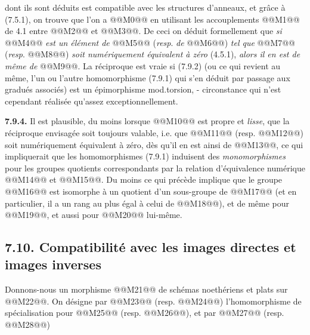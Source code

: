
dont ils sont déduits est compatible avec les structures d'anneaux, et grâce à (7.5.1), on trouve que l'on a
@@M0@@
en utilisant les accouplements @@M1@@ de 4.1 entre @@M2@@ et @@M3@@. De ceci on déduit formellement que \emph{si} @@M4@@ \emph{est un élément de} @@M5@@ (\emph{resp}. \emph{de} @@M6@@) \emph{tel que} @@M7@@ (\emph{resp}. @@M8@@) \emph{soit numériquement équivalent à zéro} (4.5.1), \emph{alors il en est de même de} @@M9@@. La réciproque est vraie si (7.9.2) (ou ce qui revient au même, l'un ou l'autre homomorphisme (7.9.1) qui s'en déduit par passage aux gradués associés) est un épimorphisme mod.torsion, - circonstance qui n'est cependant réalisée qu'assez exceptionnellement.

\textbf{7.9.4.} Il est plausible, du moins lorsque @@M10@@ est propre et \emph{lisse}, que la réciproque envisagée soit toujours valable, i.e. que @@M11@@ (resp. @@M12@@) soit numériquement équivalent à zéro, dès qu'il en est ainsi de @@M13@@, ce qui impliquerait que les homomorphismes (7.9.1) induisent des \emph{monomorphismes} pour les groupes quotients correspondants par la relation d'équivalence numérique @@M14@@ et @@M15@@. Du moins ce qui précède implique que le groupe @@M16@@ est isomorphe à un quotient d'un sous-groupe de @@M17@@ (et en particulier, il a un rang au plus égal à celui de @@M18@@), et de même pour @@M19@@, et aussi pour @@M20@@ lui-même.

\subsection*{7.10. Compatibilité avec les images directes et images inverses}
Donnons-nous un morphisme
@@M21@@
de schémas noethériens et plats sur @@M22@@. On désigne par @@M23@@ (resp. @@M24@@) l'homomorphisme de spécialisation pour @@M25@@ (resp. @@M26@@), et par @@M27@@ (resp. @@M28@@)
